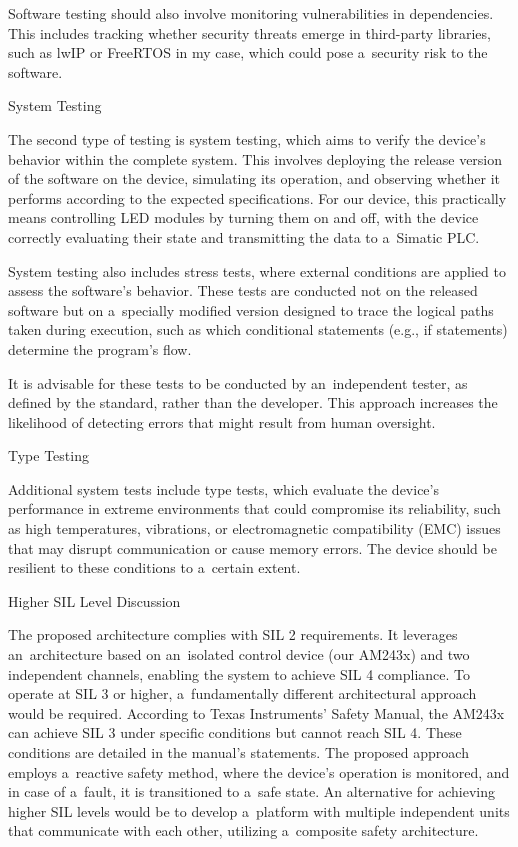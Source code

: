 Software testing should also involve monitoring vulnerabilities in dependencies. This includes tracking whether security threats emerge in third-party libraries, such as lwIP or FreeRTOS in my case, which could pose a~security risk to the software.


\secc System Testing

The second type of testing is system testing, which aims to verify the device’s behavior within the complete system. This involves deploying the release version of the software on the device, simulating its operation, and observing whether it performs according to the expected specifications. For our device, this practically means controlling LED modules by turning them on and off, with the device correctly evaluating their state and transmitting the data to a~Simatic PLC.

System testing also includes stress tests, where external conditions are applied to assess the software’s behavior. These tests are conducted not on the released software but on a~specially modified version designed to trace the logical paths taken during execution, such as which conditional statements (e.g., if statements) determine the program’s flow.

It is advisable for these tests to be conducted by an~independent tester, as defined by the standard, rather than the developer. This approach increases the likelihood of detecting errors that might result from human oversight.

\secc Type Testing

Additional system tests include type tests, which evaluate the device’s performance in extreme environments that could compromise its reliability, such as high temperatures, vibrations, or electromagnetic compatibility (EMC) issues that may disrupt communication or cause memory errors. The device should be resilient to these conditions to a~certain extent.


\sec Higher SIL Level Discussion

The proposed architecture complies with SIL 2 requirements. It leverages an~architecture based on an~isolated control device (our AM243x) and two independent channels, enabling the system to achieve SIL 4 compliance. To operate at SIL 3 or higher, a~fundamentally different architectural approach would be required. According to Texas Instruments’ Safety Manual, the AM243x can achieve SIL 3 under specific conditions but cannot reach SIL 4. These conditions are detailed in the manual’s statements. The proposed approach employs a~reactive safety method, where the device’s operation is monitored, and in case of a~fault, it is transitioned to a~safe state. An alternative for achieving higher SIL levels would be to develop a~platform with multiple independent units that communicate with each other, utilizing a~composite safety architecture.

